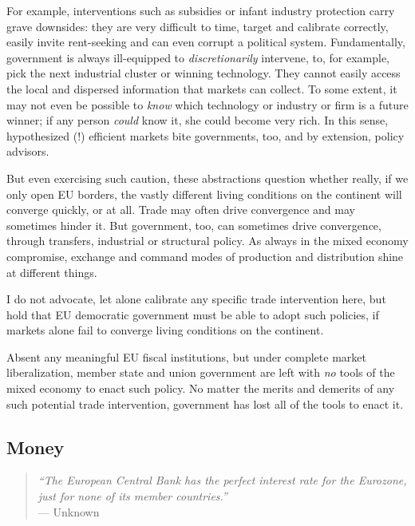 \documentclass[11pt,a4paper,oneside,openright]{article}
\begin{document}
\begin{enumerate}
	For example, interventions such as subsidies or infant industry protection carry grave downsides: 
	they are very difficult to time, target and calibrate correctly, easily invite rent-seeking and can even corrupt a political system. 
	Fundamentally, government is always ill-equipped to \emph{discretionarily} intervene, to, for example, pick the next industrial cluster or winning technology. 
	They cannot easily access the local and dispersed information that markets can collect. 
	To some extent, it may not even be possible to \emph{know} which technology or industry or firm is a future winner; if any person \emph{could} know it, she could become very rich. 
	In this sense, hypothesized (!) efficient markets bite governments, too, and by extension, policy advisors.

\end{enumerate}

But even exercising such caution, these abstractions question whether really, if we only open \gls{EU} borders, the vastly different living conditions on the continent will converge quickly, or at all. 
Trade may often drive convergence and may sometimes hinder it. 
But government, too, can sometimes drive convergence, through transfers, industrial or structural policy. 
As always in the mixed economy compromise, exchange and command modes of production and distribution shine at different things.

I do not advocate, let alone calibrate any specific trade intervention here, but hold that \gls{EU} democratic government must be able to adopt such policies, if markets alone fail to converge living conditions on the continent.

Absent any meaningful \gls{EU} fiscal institutions, but under complete market liberalization, member state and union government are left with \emph{no} tools of the mixed economy to enact such policy. 
No matter the merits and demerits of any such potential trade intervention, government has lost all of the tools to enact it.

\subsection{Money}

\begin{quote}
	\emph{``The European Central Bank has the perfect interest rate for the Eurozone, just for none of its member countries.''}\\
	--- Unknown
\end{quote}
\end{document}
